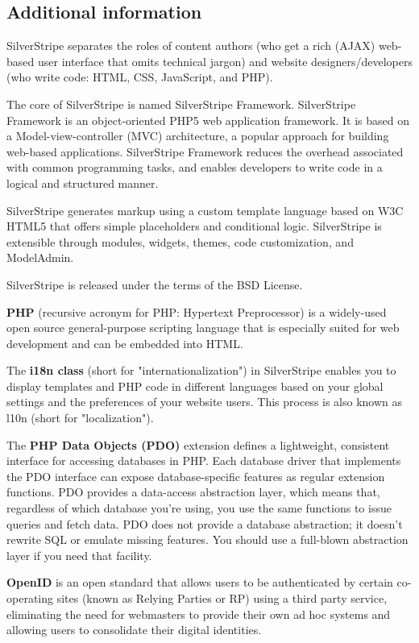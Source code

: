 \documentclass[11pt]{article}
\begin{document}
\subsection{Additional information}
SilverStripe separates the roles of content authors (who get a rich (AJAX) web-based user interface that omits technical jargon) and website designers/developers (who write code: HTML, CSS, JavaScript, and PHP).

The core of SilverStripe is named SilverStripe Framework. SilverStripe Framework is an object-oriented PHP5 web application framework. It is based on a Model-view-controller (MVC) architecture, a popular approach for building web-based applications. SilverStripe Framework reduces the overhead associated with common programming tasks, and enables developers to write code in a logical and structured manner.

SilverStripe generates markup using a custom template language based on W3C HTML5 that offers simple placeholders and conditional logic. SilverStripe is extensible through modules, widgets, themes, code customization, and ModelAdmin.

SilverStripe is released under the terms of the BSD License. 

\textbf{PHP} (recursive acronym for PHP: Hypertext Preprocessor) is a widely-used open source general-purpose scripting language that is especially suited for web development and can be embedded into HTML. 

The \textbf{i18n class }(short for "internationalization") in SilverStripe enables you to display templates and PHP code in different languages based on your global settings and the preferences of your website users. This process is also known as l10n (short for "localization").

The \textbf{PHP Data Objects (PDO)} extension defines a lightweight, consistent interface for accessing databases in PHP. Each database driver that implements the PDO interface can expose database-specific features as regular extension functions. PDO provides a data-access abstraction layer, which means that, regardless of which database you're using, you use the same functions to issue queries and fetch data. PDO does not provide a database abstraction; it doesn't rewrite SQL or emulate missing features. You should use a full-blown abstraction layer if you need that facility. 

\textbf{OpenID} is an open standard that allows users to be authenticated by certain co-operating sites (known as Relying Parties or RP) using a third party service, eliminating the need for webmasters to provide their own ad hoc systems and allowing users to consolidate their digital identities.
\end{document}
